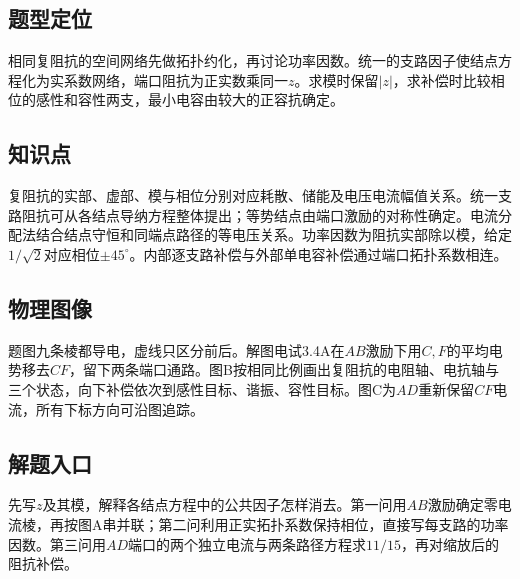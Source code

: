 \documentclass[UTF8,fontset=fandol,a4paper,11pt]{ctexart}
\begin{document}


\subsection*{题型定位}

相同复阻抗的空间网络先做拓扑约化，再讨论功率因数。统一的支路因子使结点方程化为实系数网络，端口阻抗为正实数乘同一$z$。求模时保留$|z|$，求补偿时比较相位的感性和容性两支，最小电容由较大的正容抗确定。



\subsection*{知识点}

复阻抗的实部、虚部、模与相位分别对应耗散、储能及电压电流幅值关系。统一支路阻抗可从各结点导纳方程整体提出；等势结点由端口激励的对称性确定。电流分配法结合结点守恒和同端点路径的等电压关系。功率因数为阻抗实部除以模，给定$1/\sqrt2$对应相位$\pm45^\circ$。内部逐支路补偿与外部单电容补偿通过端口拓扑系数相连。



\subsection*{物理图像}

题图九条棱都导电，虚线只区分前后。解图电试3.4A在$AB$激励下用$C,F$的平均电势移去$CF$，留下两条端口通路。图B按相同比例画出复阻抗的电阻轴、电抗轴与三个状态，向下补偿依次到感性目标、谐振、容性目标。图C为$AD$重新保留$CF$电流，所有下标方向可沿图追踪。



\subsection*{解题入口}

先写$z$及其模，解释各结点方程中的公共因子怎样消去。第一问用$AB$激励确定零电流棱，再按图A串并联；第二问利用正实拓扑系数保持相位，直接写每支路的功率因数。第三问用$AD$端口的两个独立电流与两条路径方程求$11/15$，再对缩放后的阻抗补偿。

\end{document}
